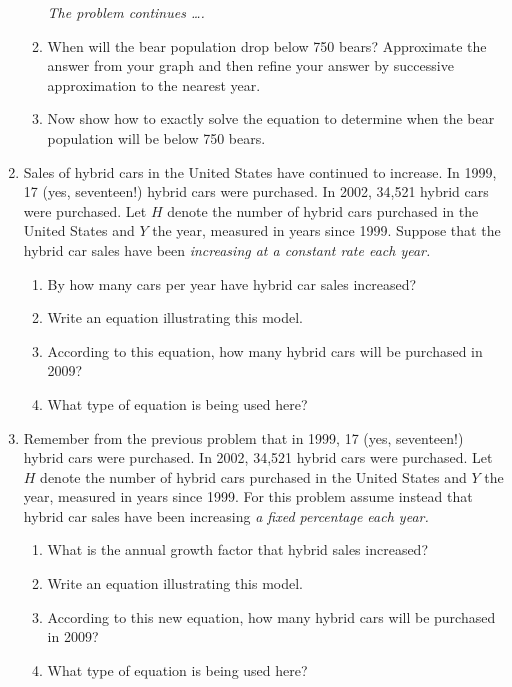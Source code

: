 \documentclass[12pt]{article}
\begin{document}
\begin{enumerate}
\begin{enumerate}
\newpage
\hspace{-.5 in}\emph{The problem continues \ldots.}

\item When will the bear population drop below 750 bears?  Approximate the answer from your graph and then refine your answer by successive approximation to the nearest year.
\vfill
\item Now show how to exactly solve the equation to determine when the bear population will be below 750 bears.
\vfill
\end{enumerate}


\newpage

\item Sales of hybrid cars in the United States have continued to increase.  In 1999, 17 (yes, seventeen!) hybrid cars were purchased.  In 2002, 34,521 hybrid cars were purchased. Let $H$ denote the number of hybrid cars purchased in the United States and $Y$ the year, measured in years since 1999.  Suppose that the hybrid car sales have been \textit{increasing at a constant rate each year.}

\begin{enumerate}
\item By how many cars per year have hybrid car sales increased?
\vfill
\item Write an equation illustrating this model.
\vfill
\item According to this equation, how many hybrid cars will be purchased in 2009?
\vfill
\item What type of equation is being used here?
\vfill
\end{enumerate}

\newpage
\item  Remember from the previous problem that in 1999, 17 (yes, seventeen!) hybrid cars were purchased.  In 2002, 34,521 hybrid cars were purchased. Let $H$ denote the number of hybrid cars purchased in the United States and $Y$ the year, measured in years since 1999.  For this problem assume instead that hybrid car sales have been increasing \textit{a fixed percentage each year.}

\begin{enumerate}
\item What is the annual growth factor that hybrid sales increased?  
\vfill
\item Write an equation illustrating this model.
\vfill
\item According to this new equation, how many hybrid cars will be purchased in 2009?
\vfill
\item What type of equation is being used here?
\vfill
\end{enumerate}






\end{enumerate}
\end{document}

